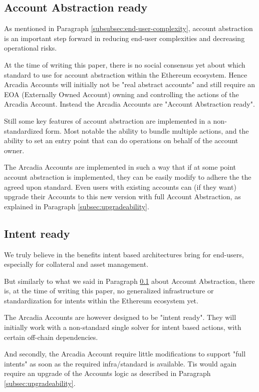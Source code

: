 \documentclass[sigconf,nonacm]{acmart}
\begin{document}
\subsection{Account Abstraction ready}
\label{subsec:account-abstraction-ready}
As mentioned in Paragraph \ref{subsubsec:end-user-complexity}, account abstraction is an important step forward in reducing end-user complexities and decreasing operational risks.

At the time of writing this paper, there is no social consensus yet about which standard to use for account abstraction within the Ethereum ecosystem.
Hence Arcadia Accounts will initially not be "real abstract accounts" and still require an EOA (Externally Owned Account) owning and controlling the actions of the Arcadia Account.
Instead the Arcadia Accounts are "Account Abstraction ready".

Still some key features of account abstraction are implemented in a non-standardized form.
Most notable the ability to bundle multiple actions, and the ability to set an entry point that can do operations on behalf of the account owner.

The Arcadia Accounts are implemented in such a way that if at some point account abstraction is implemented, they can be easily modify to adhere the the agreed upon standard.
Even users with existing accounts can (if they want) upgrade their Accounts to this new version with full Account Abstraction, as explained in Paragraph \ref{subsec:upgradeability}.

\subsection{Intent ready}
We truly believe in the benefits intent based architectures bring for end-users,
especially for collateral and asset management.

But similarly to what we said in Paragraph \ref{subsec:account-abstraction-ready} about Account Abstraction,
there is, at the time of writing this paper, no generalized infrastructure or standardization for intents within the Ethereum ecosystem yet.

The Arcadia Accounts are however designed to be "intent ready".
They will initially work with a non-standard single solver for intent based actions, with certain off-chain dependencies.

And secondly, the Arcadia Account require little modifications to support "full intents" as soon as the required infra/standard is available.
Tis would again require an upgrade of the Accounts logic as described in Paragraph \ref{subsec:upgradeability}.
\end{document}
